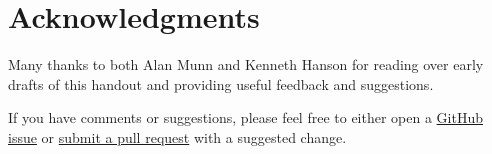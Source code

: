 
\section{Acknowledgments}
\label{sec:acknowledgments}

Many thanks to both Alan Munn and Kenneth Hanson for reading over early drafts of this handout and providing useful feedback and suggestions.

If you have comments or suggestions, please feel free to either open a \href{https://github.com/adamliter/latex-workshop/issues}{GitHub issue} or \href{https://help.github.com/articles/creating-a-pull-request/}{submit a pull request} with a suggested change.